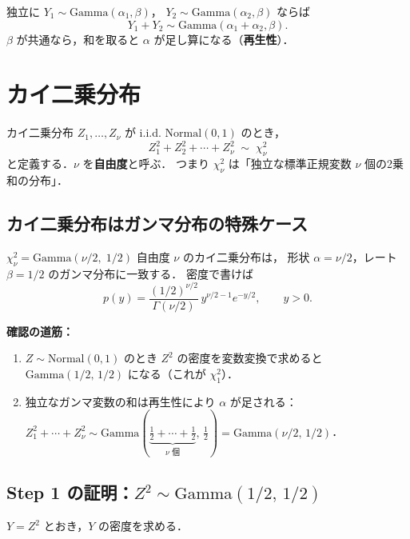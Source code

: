 \documentclass[lualatex,ja=standard,a4paper,12pt]{bxjsarticle}
\begin{document}
独立に $Y_1 \sim \mathrm{Gamma}(\alpha_1, \beta)$，
$Y_2 \sim \mathrm{Gamma}(\alpha_2, \beta)$ ならば
\[
  Y_1 + Y_2 \sim \mathrm{Gamma}(\alpha_1 + \alpha_2, \beta).
\]
$\beta$ が共通なら，和を取ると $\alpha$ が足し算になる（\textbf{再生性}）．

\section{カイ二乗分布}

\begin{defbox}{カイ二乗分布}
$Z_1, \ldots, Z_\nu$ が i.i.d. $\mathrm{Normal}(0, 1)$ のとき，
\[
  Z_1^2 + Z_2^2 + \cdots + Z_\nu^2 \;\sim\; \chi^2_\nu
\]
と定義する．$\nu$ を\textbf{自由度}と呼ぶ．
つまり $\chi^2_\nu$ は「独立な標準正規変数 $\nu$ 個の2乗和の分布」．
\end{defbox}

\subsection{カイ二乗分布はガンマ分布の特殊ケース}

\begin{thmbox}{$\chi^2_\nu = \mathrm{Gamma}(\nu/2,\; 1/2)$}
自由度 $\nu$ のカイ二乗分布は，
形状 $\alpha = \nu/2$，レート $\beta = 1/2$ のガンマ分布に一致する．
密度で書けば
\[
  p(y) = \frac{(1/2)^{\nu/2}}{\Gamma(\nu/2)}\, y^{\nu/2 - 1} e^{-y/2},
  \qquad y > 0.
\]
\end{thmbox}

\noindent\textbf{確認の道筋：}
\begin{enumerate}
  \item $Z \sim \mathrm{Normal}(0,1)$ のとき $Z^2$ の密度を変数変換で求めると
        $\mathrm{Gamma}(1/2,\, 1/2)$ になる（これが $\chi^2_1$）．
  \item 独立なガンマ変数の和は再生性により $\alpha$ が足される：
        $Z_1^2 + \cdots + Z_\nu^2 \sim
         \mathrm{Gamma}(\underbrace{\tfrac12 + \cdots + \tfrac12}_{\nu \text{ 個}},\, \tfrac12)
         = \mathrm{Gamma}(\nu/2,\, 1/2)$．
\end{enumerate}

\subsection{Step 1 の証明：$Z^2 \sim \mathrm{Gamma}(1/2,\, 1/2)$}

$Y = Z^2$ とおき，$Y$ の密度を求める．
\end{document}

